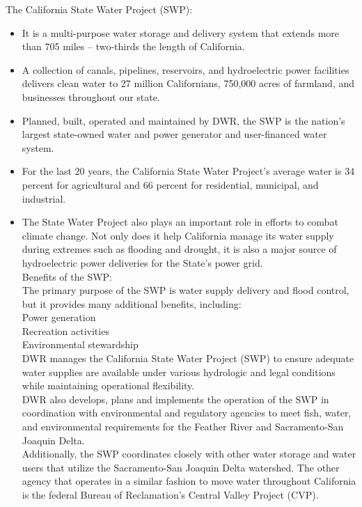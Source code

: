 \documentclass{article}
\begin{document}
The California State Water Project (SWP):
\begin{itemize} 
\item It is a multi-purpose water storage and delivery system that extends more than 705 miles -- two-thirds the length of California. 
\item A collection of canals, pipelines, reservoirs, and hydroelectric power facilities delivers clean water to 27 million Californians, 750,000 acres of farmland, and businesses throughout our state.
\item Planned, built, operated and maintained by DWR, the SWP is the nation’s largest state-owned water and power generator and user-financed water system.
\item For the last 20 years, the California State Water Project’s average water is 34 percent for agricultural and 66 percent for residential, municipal, and industrial.\\
\item The State Water Project also plays an important role in efforts to combat climate change. Not only does it help California manage its water supply during extremes such as flooding and drought, it is also a major source of hydroelectric power deliveries for the State's power grid.\\

Benefits of the SWP:\\
The primary purpose of the SWP is water supply delivery and flood control, but it provides many additional benefits, including:\\

Power generation\\
Recreation activities\\
Environmental stewardship\\

DWR manages the California State Water Project (SWP) to ensure adequate water supplies are available under various hydrologic and legal conditions while maintaining operational flexibility. \\

DWR also develops, plans and implements the operation of the SWP in coordination with environmental and regulatory agencies to meet fish, water, and environmental requirements for the Feather River and Sacramento-San Joaquin Delta.\\

Additionally, the SWP coordinates closely with other water storage and water users that utilize the Sacramento-San Joaquin Delta watershed. The other agency that operates in a similar fashion to move water throughout California is the federal Bureau of Reclamation’s Central Valley Project (CVP).\\


\end{itemize}
\end{document}
